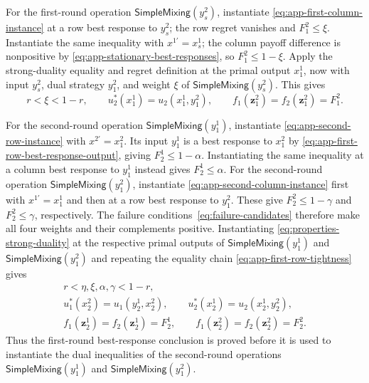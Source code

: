 \documentclass[11pt]{article}
\theoremstyle{remark}
\theoremstyle{plain}
\newcommand{\sm}{\mathsf{SimpleMixing}}
\begin{document}
For the first-round operation $\sm(y_s^2)$, instantiate
\eqref{eq:app-first-column-instance} at a row best response to
$y_s^2$; the row regret vanishes and $F_1^2\le\xi$.
Instantiate the same inequality with $x^{1\prime}=x_s^1$;
the column payoff difference is nonpositive by
\eqref{eq:app-stationary-best-responses}, so $F_1^2\le1-\xi$.
Apply the strong-duality equality and regret definition at the
primal output $x_1^1$, now with input $y_s^2$, dual strategy
$y_1^2$, and weight $\xi$ of $\sm(y_s^2)$. This gives
\begin{equation}
 r<\xi<1-r,\qquad
 u_2^*(x_1^1)=u_2(x_1^1,y_1^2),\qquad
 f_1(\boldsymbol z_1^2)=f_2(\boldsymbol z_1^2)=F_1^2.
 \label{eq:app-first-column-best-response-output}
\end{equation}

For the second-round operation $\sm(y_1^1)$, instantiate
\eqref{eq:app-second-row-instance} with $x^{2\prime}=x_1^2$.
Its input $y_1^1$ is a best response to $x_1^2$ by
\eqref{eq:app-first-row-best-response-output}, giving
$F_2^1\le1-\alpha$. Instantiating the same inequality at a column
best response to $y_1^1$ instead gives $F_2^1\le\alpha$.
For the second-round operation $\sm(y_1^2)$, instantiate
\eqref{eq:app-second-column-instance} first with $x^{1\prime}=x_1^1$
and then at a row best response to $y_1^2$. These give
$F_2^2\le1-\gamma$ and $F_2^2\le\gamma$, respectively.
The failure conditions~\eqref{eq:failure-candidates} therefore make all
four weights and their complements positive. Instantiating
\eqref{eq:properties-strong-duality} at the respective primal outputs
of $\sm(y_1^1)$ and $\sm(y_1^2)$ and repeating the equality chain
\eqref{eq:app-first-row-tightness} gives
\begin{equation}
 \begin{gathered}
 r<\eta,\xi,\alpha,\gamma<1-r,\\
 u_1^*(x_2^2)=u_1(y_2^1,x_2^2),\qquad
 u_2^*(x_2^1)=u_2(x_2^1,y_2^2),\\
 f_1(\boldsymbol z_2^1)=f_2(\boldsymbol z_2^1)=F_2^1,\qquad
 f_1(\boldsymbol z_2^2)=f_2(\boldsymbol z_2^2)=F_2^2.
 \end{gathered}
 \label{eq:app-positive-call-weights}
\end{equation}
Thus the first-round best-response conclusion is proved before
it is used to instantiate the dual inequalities of the second-round
operations $\sm(y_1^1)$ and $\sm(y_1^2)$.
\end{document}
